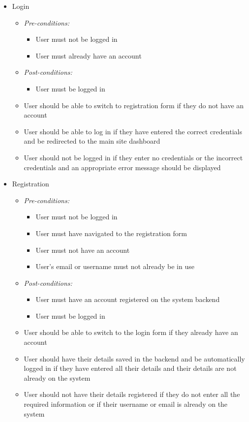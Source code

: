 \documentclass{article}
\begin{document}
			\begin{itemize}
				\item Login
				
				\begin{itemize}
					\item \textit{Pre-conditions:}
					\begin{itemize}
						\item User must not be logged in
						\item User must already have an account
					\end{itemize}
					\item \textit{Post-conditions:}
					\begin{itemize}
						\item User must be logged in
					\end{itemize}						 
					\item User should be able to switch to registration form if they do not have an account
					\item User should be able to log in if they have entered the correct credentials and be redirected to the main site dashboard
					\item User should not be logged in if they enter no credentials or the incorrect credentials and an appropriate error message should be displayed
					
				\end{itemize}
				
				\item Registration
				\begin{itemize}
					\item \textit{Pre-conditions:}
					\begin{itemize}
						\item User must not be logged in
						\item User must have navigated to the registration form
						\item User must not have an account
						\item User's email or username must not already be in use
					\end{itemize}
					\item \textit{Post-conditions:}
					\begin{itemize}
						\item User must have an account registered on the system backend
						\item User must be logged in
					\end{itemize}
					\item User should be able to switch to the login form if they already have an account
					\item User should have their details saved in the backend and be automatically logged in if they have entered all their details and their details are not already on the system
					\item User should not have their details registered if they do not enter all the required information or if their username or email is already on the system
				\end{itemize}				 
			\end{itemize}
\end{document}
